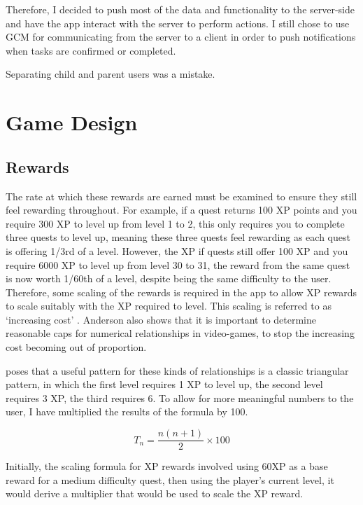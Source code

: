 Therefore, I decided to push most of the data and functionality to the server-side and have the app interact with the server to perform actions.
I still chose to use GCM for communicating from the server to a client in order to push notifications when tasks are confirmed or completed.





Separating child and parent users was a mistake.

\section{Game Design}
\subsection{Rewards}
The rate at which these rewards are earned must be examined to ensure they still feel rewarding throughout. 
For example, if a quest returns 100 XP points and you require 300 XP to level up from level 1 to 2, this only requires you to complete three quests to level up, meaning these three quests feel rewarding as each quest is offering 1/3rd of a level.
However, the XP if quests still offer 100 XP and you require 6000 XP to level up from level 30 to 31, the reward from the same quest is now worth 1/60th of a level, despite being the same difficulty to the user.
Therefore, some scaling of the rewards is required in the app to allow XP rewards to scale suitably with the XP required to level.
This scaling is referred to as `increasing cost' \citep{1_anderson_2016}.
Anderson also shows that it is important to determine reasonable caps for numerical relationships in video-games, to stop the increasing cost becoming out of proportion.

\cite{1_anderson_2016} poses that a useful pattern for these kinds of relationships is a classic triangular pattern, in which the first level requires 1 XP to level up, the second level requires 3 XP, the third requires 6. To allow for more meaningful numbers to the user, I have multiplied the results of the formula by 100.

\begin{equation} \label{eq:xprequiredfornextlevel}
	T_n= \frac{n(n+1)}{2} \times 100
\end{equation}

Initially, the scaling formula for XP rewards involved using 60XP as a base reward for a medium difficulty quest, then using the player's current level, it would derive a multiplier that would be used to scale the XP reward.

